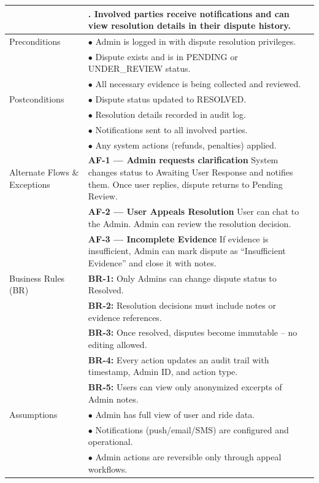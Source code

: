\begin{longtable}{|>{\raggedright\arraybackslash}p{4cm}|>{\raggedright\arraybackslash}p{11cm}|}
& 6. Involved parties receive notifications and can view resolution details in their dispute history. \\
\hline
Preconditions & $\bullet$ Admin is logged in with dispute resolution privileges. \\
& $\bullet$ Dispute exists and is in PENDING or UNDER\_REVIEW status. \\
& $\bullet$ All necessary evidence is being collected and reviewed. \\
\hline
Postconditions & $\bullet$ Dispute status updated to RESOLVED. \\
& $\bullet$ Resolution details recorded in audit log. \\
& $\bullet$ Notifications sent to all involved parties. \\
& $\bullet$ Any system actions (refunds, penalties) applied. \\
\hline
Alternate Flows \& Exceptions & \textbf{AF-1 — Admin requests clarification} \newline System changes status to Awaiting User Response and notifies them. Once user replies, dispute returns to Pending Review. \\
& \textbf{AF-2 — User Appeals Resolution} \newline User can chat to the Admin. Admin can review the resolution decision. \\
& \textbf{AF-3 — Incomplete Evidence} \newline If evidence is insufficient, Admin can mark dispute as ``Insufficient Evidence'' and close it with notes. \\
\hline
Business Rules (BR) & \textbf{BR-1:} Only Admins can change dispute status to Resolved. \\
& \textbf{BR-2:} Resolution decisions must include notes or evidence references. \\
& \textbf{BR-3:} Once resolved, disputes become immutable – no editing allowed. \\
& \textbf{BR-4:} Every action updates an audit trail with timestamp, Admin ID, and action type. \\
& \textbf{BR-5:} Users can view only anonymized excerpts of Admin notes. \\
\hline
Assumptions & $\bullet$ Admin has full view of user and ride data. \\
& $\bullet$ Notifications (push/email/SMS) are configured and operational. \\
& $\bullet$ Admin actions are reversible only through appeal workflows. \\
\hline
\end{longtable}
